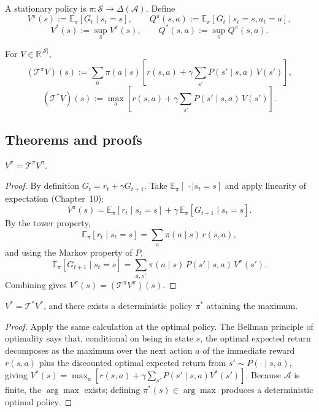 \begin{definition}
A stationary policy is $\pi : \mathcal{S}\to\Delta(\mathcal{A})$. Define
\[
V^\pi(s) := \mathbb{E}_\pi[G_t\mid s_t=s], \qquad
Q^\pi(s,a) := \mathbb{E}_\pi[G_t\mid s_t=s, a_t=a],
\]
\[
V^*(s) := \sup_\pi V^\pi(s), \qquad Q^*(s,a) := \sup_\pi Q^\pi(s,a).
\]
\end{definition}

\begin{definition}
For $V \in \mathbb{R}^{|\mathcal{S}|}$,
\[
(\mathcal{T}^\pi V)(s) := \sum_a \pi(a\mid s)\!\left[r(s,a) + \gamma \sum_{s'} P(s'\mid s,a)\, V(s')\right],
\]
\[
(\mathcal{T}^* V)(s) := \max_a\!\left[r(s,a) + \gamma \sum_{s'} P(s'\mid s,a)\, V(s')\right].
\]
\end{definition}

\subsection*{Theorems and proofs}

\begin{theorem}
$V^\pi = \mathcal{T}^\pi V^\pi$.
\end{theorem}

\begin{proof}
By definition $G_t = r_t + \gamma G_{t+1}$. Take $\mathbb{E}_\pi[\,\cdot\mid s_t = s]$ and apply linearity of expectation (Chapter~10):
\[
V^\pi(s) = \mathbb{E}_\pi[r_t \mid s_t=s] + \gamma \,\mathbb{E}_\pi[G_{t+1}\mid s_t=s].
\]
By the tower property,
\[
\mathbb{E}_\pi[r_t\mid s_t=s] = \sum_a \pi(a\mid s)\, r(s,a),
\]
and using the Markov property of $P$,
\[
\mathbb{E}_\pi[G_{t+1}\mid s_t=s] = \sum_{a,s'} \pi(a\mid s)\, P(s'\mid s,a)\, V^\pi(s').
\]
Combining gives $V^\pi(s) = (\mathcal{T}^\pi V^\pi)(s)$.
\end{proof}

\begin{theorem}
$V^* = \mathcal{T}^* V^*$, and there exists a deterministic policy $\pi^*$ attaining the maximum.
\end{theorem}

\begin{proof}
Apply the same calculation at the optimal policy. The Bellman principle of optimality says that, conditional on being in state $s$, the optimal expected return decomposes as the maximum over the next action $a$ of the immediate reward $r(s,a)$ plus the discounted optimal expected return from $s' \sim P(\cdot\mid s,a)$, giving $V^*(s) = \max_a [r(s,a) + \gamma\sum_{s'} P(s'\mid s,a) V^*(s')]$. Because $\mathcal{A}$ is finite, the $\arg\max$ exists; defining $\pi^*(s)\in\arg\max$ produces a deterministic optimal policy.
\end{proof}

